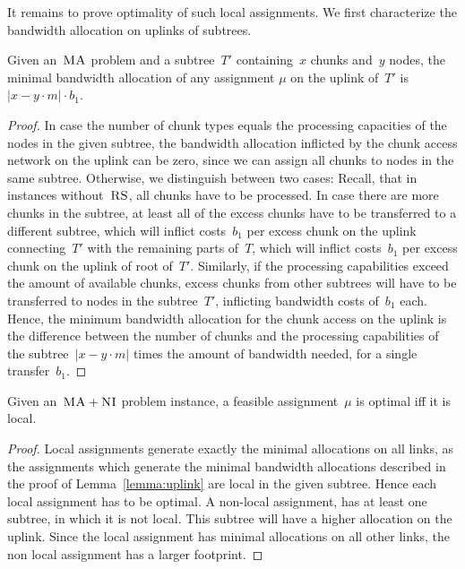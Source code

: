 \documentclass[preprint,12pt]{elsarticle}
\newcommand{\MaFactor}{m}
\newcommand{\VmChunkAssignment}{\mu}
\newcommand{\CC}{\textsc{NI}}
\newcommand{\RS}{\textsc{RS}}
\newcommand{\MA}{\textsc{MA}}
\newcommand{\Tree}{\ensuremath{T}}
\newcommand{\CostTrans}{\ensuremath{b_1}}
\begin{document}
It remains to prove optimality of such local assignments.
We first characterize the bandwidth allocation on uplinks of subtrees.
\begin{lemma}\label{lem:uplink-alloc}
Given an~$\MA$ problem and a subtree~$\Tree'$
containing~$x$
chunks and~$y$ nodes, the minimal bandwidth allocation of any
assignment
$\VmChunkAssignment$ on the uplink of~$\Tree'$ is~$|x-y\cdot\MaFactor|\cdot
\CostTrans$.
\label{lemma:uplink}
\end{lemma}
\begin{proof}
In case the number of chunk types equals the processing capacities of the
nodes in the given subtree,
the bandwidth allocation inflicted by the chunk access network on the uplink can
be
zero, since we can assign all chunks to nodes in the same subtree.
Otherwise, we distinguish between two cases: Recall, that in instances
without~$\RS$, all chunks have to be processed. In case
there are more chunks in the subtree, at least all of the excess chunks have to
be transferred to a different subtree, which will
inflict costs~$\CostTrans$ per excess chunk on the uplink connecting~$\Tree'$
with the
remaining parts of~$\Tree$, which will inflict costs~$\CostTrans$ per excess chunk on the uplink of root of~$\Tree'$.
 Similarly, if the processing capabilities exceed the
amount of
available chunks, excess chunks from other subtrees will have to be transferred
to
nodes in the subtree~$\Tree'$, inflicting bandwidth costs of~$\CostTrans$ each.
Hence, the minimum bandwidth allocation for the chunk access on the uplink
is the difference between the number of chunks and the processing capabilities
of the subtree~$|x-y\cdot\MaFactor|$ times the amount of bandwidth needed,
for a single transfer~$\CostTrans$.
\end{proof}


\begin{theorem}
Given an~$\MA+\CC$ problem instance, a feasible assignment~$\VmChunkAssignment$
is optimal iff it is local.
\label{thm:local_optimal}
\end{theorem}

\begin{proof}
Local assignments generate exactly the minimal allocations on all links, as
 the assignments which generate the minimal bandwidth allocations
described in
the proof of
Lemma~\ref{lemma:uplink} are local in the given subtree. Hence
each local assignment has to be optimal. A non-local assignment, has at least
one subtree, in which it is not local. This subtree will have a higher
allocation on the uplink. Since the local assignment has minimal allocations
on all other links, the non local assignment has a larger footprint.
\end{proof}
\end{document}

